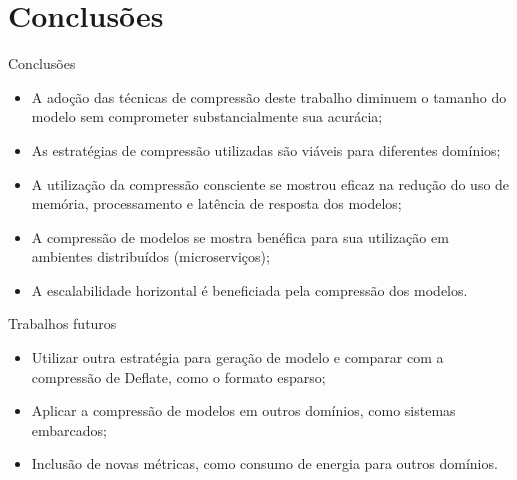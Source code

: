 \section{Conclusões}
\begin{frame}{Conclusões}
    \scriptsize
    \begin{itemize}
        \item A adoção das técnicas de compressão deste trabalho diminuem o tamanho do modelo sem comprometer substancialmente sua acurácia;
        \item As estratégias de compressão utilizadas são viáveis para diferentes domínios;
        \item A utilização da compressão consciente se mostrou eficaz na redução do uso de memória, processamento e latência de resposta dos modelos;
        \item A compressão de modelos se mostra benéfica para sua utilização em ambientes distribuídos (microserviços);
        \item A escalabilidade horizontal é beneficiada pela compressão dos modelos.
    \end{itemize}
\end{frame}

\begin{frame}{Trabalhos futuros}
    \scriptsize
    \begin{itemize}
        \item Utilizar outra estratégia para geração de modelo e comparar com a compressão de Deflate, como o formato esparso;
        \item Aplicar a compressão de modelos em outros domínios, como sistemas embarcados;
        \item Inclusão de novas métricas, como consumo de energia para outros domínios.
    \end{itemize}
\end{frame}